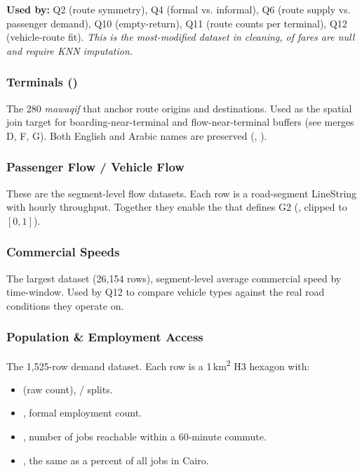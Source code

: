 \textbf{Used by:} Q2 (route symmetry), Q4 (formal vs. informal), Q6 (route
supply vs. passenger demand), Q10 (empty-return), Q11 (route counts per
terminal), Q12 (vehicle-route fit). \textit{This is the most-modified
dataset in cleaning,  of fares are null and require KNN
imputation.}

\subsubsection{Terminals ()}

The 280 \emph{mawaqif} that anchor route origins and destinations. Used
as the spatial join target for boarding-near-terminal and flow-near-terminal
buffers (see merges D, F, G). Both English and Arabic names are
preserved (, ).

\subsubsection{Passenger Flow / Vehicle Flow}

These are the segment-level flow datasets. Each row is a road-segment
LineString with hourly throughput. Together they enable the
 that defines G2 (,
clipped to $[0, 1]$).

\subsubsection{Commercial Speeds}

The largest dataset (26{,}154 rows), segment-level average commercial
speed by time-window. Used by Q12 to compare vehicle types against the
real road conditions they operate on.

\subsubsection{Population \& Employment Access}

The 1{,}525-row demand dataset. Each row is a 1\,km\textsuperscript{2}
H3 hexagon with:

\begin{itemize}
 \item {} (raw count),  /  splits.
 \item {}, formal employment count.
 \item {}, number of jobs reachable within
 a 60-minute commute.
 \item {}, the same as a percent of all
 jobs in Cairo.
\end{itemize}

